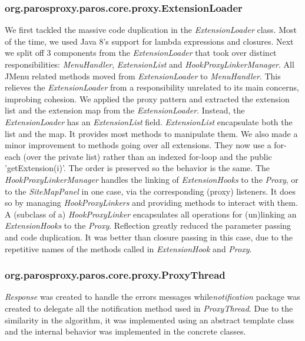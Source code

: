 \subsubsection{org.parosproxy.paros.core.proxy.ExtensionLoader}
We first tackled the massive code duplication in  the \textit{ExtensionLoader} class. Most of the time, we used Java 8's support for lambda expressions and closures. Next we split off 3 components from the \textit{ExtensionLoader} that took over distinct responsibilities: \textit{MenuHandler}, \textit{ExtensionList} and \textit{HookProxyLinkerManager}.
All JMenu related methods moved from \textit{ExtensionLoader} to \textit{MenuHandler}. This relieves the \textit{ExtensionLoader} from a responsibility unrelated to its main concerns, improbing cohesion.
We applied the proxy pattern and extracted the extension list and the extension map from the \textit{ExtensionLoader}. Instead, the \textit{ExtensionLoader} has an \textit{ExtensionList} field. \textit{ExtensionList} encapsulate both the list and the map. It provides most methods to manipulate them.
We also made a minor improvement to methods going over all extensions. They now use a for-each (over the private list) rather than an indexed for-loop and the public 'getExtension(i)'. The order is preserved so the behavior is the same.
The \textit{HookProxyLinkerManager} handles the linking of \textit{ExtensionHooks} to the \textit{Proxy}, or to the \textit{SiteMapPanel} in one case, via the corresponding (proxy) listeners. It does so by managing \textit{HookProxyLinkers} and providing methods to interact with them.
A (subclass of a) \textit{HookProxyLinker} encapsulates all operations for (un)linking an \textit{ExtensionHooks} to the \textit{Proxy}. Reflection greatly reduced the parameter passing and code duplication. It was better than closure passing in this case, due to the repetitive names of the methods called in \textit{ExtensionHook} and \textit{Proxy}.
\subsubsection{org.parosproxy.paros.core.proxy.ProxyThread}

\textit{Response} was created to handle the errors messages while\textit{notification} package was created to delegate all the notification method used in \textit{ProxyThread}. Due to the similarity in the algorithm, it was implemented using an abstract template class and the internal behavior was implemented in the concrete classes.
